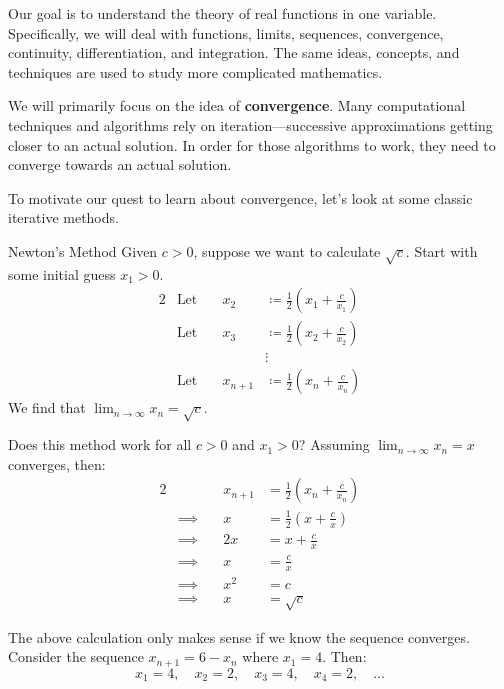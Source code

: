 Our goal is to understand the theory of real functions in one variable. Specifically, we will deal with functions, limits, sequences, convergence, continuity, differentiation, and integration. The same ideas, concepts, and techniques are used to study more complicated mathematics.

We will primarily focus on the idea of \textbf{convergence}. Many computational techniques and algorithms rely on iteration---successive approximations getting closer to an actual solution. In order for those algorithms to work, they need to converge towards an actual solution.

To motivate our quest to learn about convergence, let's look at some classic iterative methods.

\begin{exbox}{Newton's Method}{}
    Given $c > 0$, suppose we want to calculate $\sqrt{c}$. Start with some initial guess $x_1 > 0$.
    \begin{alignat*}{2}
        & \text{Let}\quad & x_2 &\coloneq \frac{1}{2} \left( x_1 + \frac{c}{x_1} \right) \\
        & \text{Let}\quad & x_3 &\coloneq \frac{1}{2} \left( x_2 + \frac{c}{x_2} \right) \\
        && &\vdots \\
        & \text{Let}\quad & x_{n+1} &\coloneq \frac{1}{2} \left( x_n + \frac{c}{x_n} \right)
    \end{alignat*}
    We find that $\lim_{n\to\infty} x_n = \sqrt{c}$.
\end{exbox}

Does this method work for all $c > 0$ and $x_1 > 0$? Assuming $\lim_{n\to\infty} x_n = x$ converges, then:
\begin{alignat*}{2}
    && x_{n+1} &= \frac{1}{2} \left( x_n + \frac{c}{x_n} \right) \\
    &\implies \quad &x &= \frac{1}{2} \left( x + \frac{c}{x} \right) \\
    &\implies &2x &= x + \frac{c}{x} \\
    &\implies &x &= \frac{c}{x} \\
    &\implies &x^2 &= c \\
    &\implies &x &= \sqrt{c}
\end{alignat*}

The above calculation only makes sense if we know the sequence converges. Consider the sequence $x_{n+1} = 6 - x_n$ where $x_1 = 4$. Then:
\[ x_1 = 4,\quad x_2 = 2,\quad x_3 = 4,\quad x_4 = 2,\quad \ldots \]

